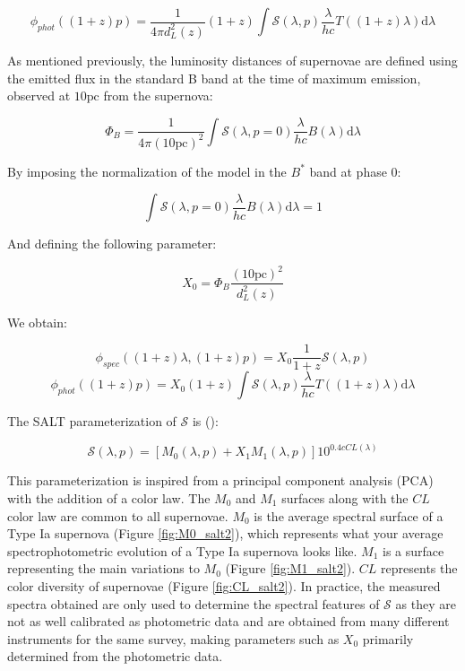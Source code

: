 \begin{equation}
    \phi_{phot}((1+z)p) = \frac{1}{4\pi d_L^2(z)} (1+z) \int \mathcal{S}(\lambda, p)\frac{\lambda}{hc}T((1+z)\lambda) \text{d}\lambda
    \label{eqn:broadband_flux}
\end{equation}

As mentioned previously, the luminosity distances of supernovae are defined using the emitted flux in the standard B band at the time of maximum emission, observed at 
$10\text{pc}$ from the supernova: 

\begin{equation}
    \Phi_B = \frac{1}{4\pi(10\text{pc})^2} \int \mathcal{S}(\lambda , p=0) \frac{\lambda}{hc}B(\lambda) \text{d}\lambda
\end{equation}

By imposing the normalization of the model in the $B^*$ band at phase 0:

\begin{equation}
    \int \mathcal{S}(\lambda , p=0) \frac{\lambda}{hc}B(\lambda) \text{d}\lambda = 1
\end{equation}

And defining the following parameter: 

\begin{equation}
    X_0 = \Phi_B \frac{(10\text{pc})^2}{d_L^2(z)}
\end{equation}

We obtain: 

\begin{equation}
    \phi_{spec}((1+z)\lambda, (1+z)p) = X_0 \frac{1}{1+z} \mathcal{S}(\lambda, p)
\end{equation}
\begin{equation}
    \phi_{phot}((1+z)p) = X_0 (1+z) \int \mathcal{S}(\lambda, p)\frac{\lambda}{hc}T((1+z)\lambda) \text{d}\lambda
    \label{eqn:boradband_flux}
\end{equation}

The SALT parameterization of $\mathcal{S}$ is (\cite{Guy_2007_SALT2}):

\begin{equation}
    \boxed{\mathcal{S}(\lambda,p) = [M_0(\lambda,p) + X_1M_1(\lambda, p)]10^{0.4cCL(\lambda)}}
\end{equation}

This parameterization is inspired from a principal component analysis (PCA) with the addition of a color law. The $M_0$ and $M_1$ surfaces along with the $CL$ color law are 
common to all supernovae. $M_0$ is the average spectral surface of a Type Ia supernova (Figure \ref{fig:M0_salt2}), which represents what your average spectrophotometric evolution of a Type Ia 
supernova looks like.
$M_1$ is a surface representing the main variations to $M_0$ (Figure \ref{fig:M1_salt2}). $CL$ represents the color diversity of supernovae (Figure \ref{fig:CL_salt2}). In practice, the measured spectra obtained are only used to 
determine the spectral features of $\mathcal{S}$ as they are not as well calibrated as photometric data and are obtained from many different instruments for the same survey, 
making parameters such as $X_0$ primarily determined from the photometric data. \\

